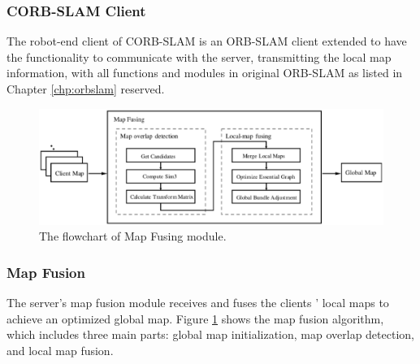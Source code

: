 \subsubsection{CORB-SLAM Client}
The robot-end client of CORB-SLAM is an ORB-SLAM client extended to have the functionality to communicate with the server, transmitting the local map information, with all functions and modules in original ORB-SLAM as listed in Chapter \ref{chp:orbslam} reserved.

\begin{figure}[H]
	\centering
	\includegraphics[width=5in]{Chapter2/corbslamserver.eps}
	\caption{The flowchart of Map Fusing module.}
	\label{fig:corbslamserver} 
\end{figure}

\subsubsection{Map Fusion}
The server's map fusion module receives and fuses the clients ' local maps to achieve an optimized global map. Figure \ref{fig:corbslamserver} shows the map fusion algorithm, which includes three main parts: global map initialization, map overlap detection, and local map fusion.

